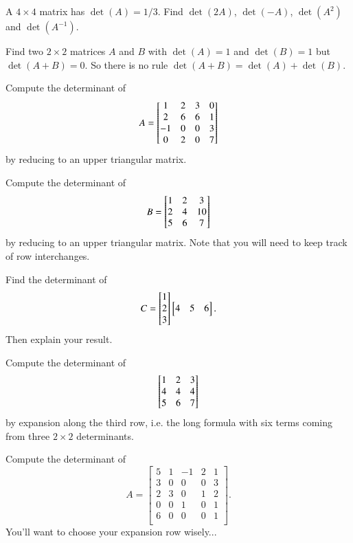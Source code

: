 \documentclass[minion]{homework}
\begin{document}
\begin{problems}

    


    \problem A $4 \times 4$ matrix has $\det(A)=1/3$.  Find
    $\det(2A)$, $\det(-A)$, $\det(A^2)$ and $\det(A^{-1})$.

    \problem Find two $2\times 2$ matrices $A$ and $B$ with 
    $\det(A)=1$ and $\det(B)=1$ but $\det(A+B)=0$. So there is
    no rule $\det(A+B)=\det(A)+\det(B)$.

    \problem Compute the determinant of 
    \[ A=
      \begin{bmatrix}
        1 & 2 & 3 & 0 \cr
        2 & 6 & 6 & 1 \cr
        -1 & 0 & 0 & 3 \cr
        0 & 2 & 0 & 7 
      \end{bmatrix}
    \]
    by reducing to an upper triangular matrix.

    \problem Compute the determinant of 
    \[B=
      \begin{bmatrix}
        1 & 2 & 3  \cr
        2 & 4 & 10 \cr
        5 & 6 & 7 \cr
      \end{bmatrix}
    \]
    by reducing to an upper triangular matrix.  Note that you will need
    to keep track of row interchanges.

    \problem Find the determinant of 
    \[C=
    \begin{bmatrix} 1 \cr 2 \cr 3\end{bmatrix} 
    \begin{bmatrix} 4 & 5 & 6\end{bmatrix}.
    \]
    Then explain your result.

    \problem Compute the determinant of 
    \[    
    \begin{bmatrix}
        1 & 2 & 3 \cr
        4 & 4 & 4 \cr
        5 & 6 & 7
    \end{bmatrix}
    \]
    by expansion along the third row, i.e. the long formula with six terms 
    coming from three $2\times 2$ determinants.

    \problem
    Compute the determinant of
    $$
    A=\begin{bmatrix}
    5 & 1 & -1 & 2 & 1 \\
    3 & 0 & 0 & 0 & 3  \\
    2 & 3 & 0 & 1 & 2  \\
    0 & 0 & 1 & 0 & 1  \\
    6 & 0 & 0 & 0 & 1  \\
    \end{bmatrix}.
    $$
    You'll want to choose your expansion row wisely...


\end{problems}
\end{document}
